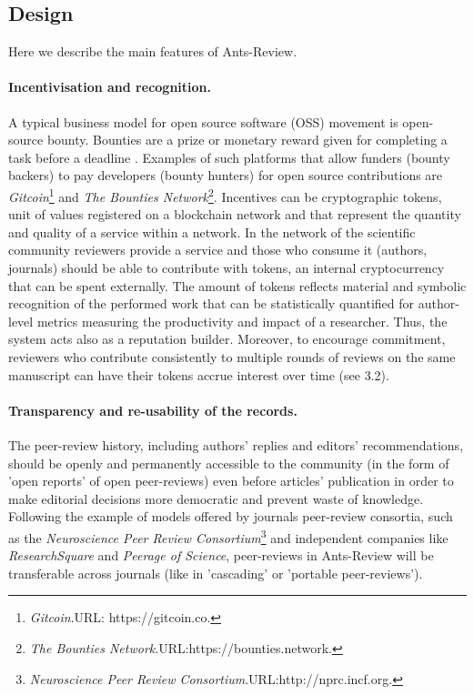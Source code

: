 \documentclass[runningheads]{llncs}
\begin{document}
\subsection{Design}

Here we describe the main features of Ants-Review.
\paragraph{Incentivisation and recognition.} A typical business model for open source software (OSS) movement is open-source bounty. Bounties are a prize or monetary reward given for completing a task before a deadline \cite{BountyGit}. Examples of such platforms that allow funders (bounty backers) to pay developers (bounty hunters) for open source contributions are \emph{Gitcoin}\footnote[4]{\emph{Gitcoin}.\textsc{URL:} https://gitcoin.co.} and \emph{The Bounties Network}\footnote[5]{\emph{The Bounties Network}.\textsc{URL:}https://bounties.network.}. Incentives can be cryptographic tokens, unit of values registered on a blockchain network and that represent the quantity and quality of a service within a network.
\newline In the network of the scientific community reviewers provide a service and those who consume it (authors, journals)  should be able to contribute with tokens, an internal cryptocurrency that can be spent externally. The amount of tokens reflects material and symbolic recognition of the performed work that can be statistically quantified for author-level metrics measuring the productivity and impact of a researcher.
Thus, the system acts also as a reputation builder.
\newline Moreover, to encourage commitment, reviewers who contribute consistently to multiple rounds of reviews on the same manuscript can have their tokens accrue interest over time (see 3.2).

\paragraph{Transparency and re-usability of the records.} The peer-review history, including authors' replies and editors' recommendations, should be openly and permanently accessible to the community (in the form of 'open reports' of open peer-reviews) even before articles' publication in order to  make editorial decisions more democratic and prevent waste of knowledge. Following the example of models offered by journals peer-review consortia, such as the \emph{Neuroscience Peer Review Consortium}\footnote[6]{\emph{Neuroscience Peer Review Consortium}.\textsc{URL:}http://nprc.incf.org.} and independent companies like \emph{ResearchSquare}  and \emph{Peerage of Science}, peer-reviews in Ants-Review will be transferable across journals (like in 'cascading' or 'portable peer-reviews').
\end{document}

